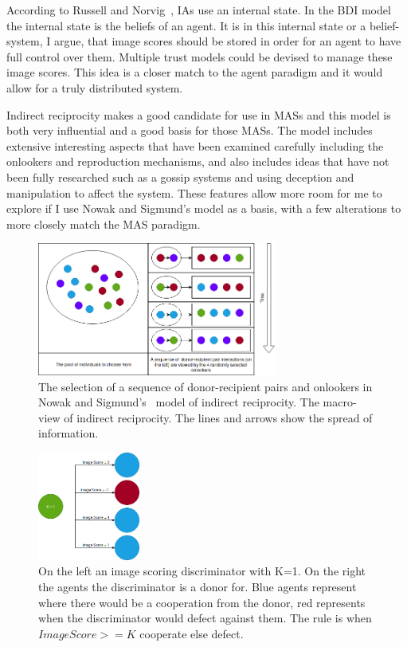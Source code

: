 \documentclass[]{final_report}
\begin{document}
According to Russell and Norvig~\cite{russell2016artificial}, IAs use an internal state. In the BDI model~\cite{rao1995bdi} the internal state is the beliefs of an agent. It is in this internal state or a belief-system, I argue, that image scores should be stored in order for an agent to have full control over them. Multiple trust models could be devised to manage these image scores. This idea is a closer match to the agent paradigm and it would allow for a truly distributed system.\par
Indirect reciprocity makes a good candidate for use in MASs and this model is both very influential and a good basis for those MASs. The model includes extensive interesting aspects that have been examined carefully including the onlookers and reproduction mechanisms, and also includes ideas that have not been fully researched such as a gossip systems and using deception and manipulation to affect the system. These features allow more room for me to explore if I use Nowak and Sigmund's model as a basis, with a few alterations to more closely match the MAS paradigm.
\begin{figure}
	\center
	\includegraphics[width=0.7\textwidth]{Onlookers.png}
	\caption{The selection of a sequence of donor-recipient pairs and onlookers in Nowak and Sigmund's~\cite{evol_indirect_image} model of indirect reciprocity. The macro-view of indirect reciprocity. The lines and arrows show the spread of information.}
	\label{fig:onlookers}
\end{figure}
\begin{figure}
	\center
	\includegraphics[width=0.3\textwidth]{Image_Scoring.png}
	\caption{On the left an image scoring discriminator with K=1. On the right the agents the discriminator is a donor for. Blue agents represent where there would be a cooperation from the donor, red represents when the discriminator would defect against them. The rule is when $Image Score >= K$ cooperate else defect.}
	\label{fig:image_discriminator}
\end{figure}
\end{document}
